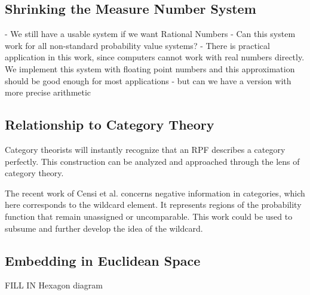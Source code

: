 \documentclass[twoside]{article}
\theoremstyle{plain}%
\theoremstyle{definition}
\theoremstyle{remark}
\begin{document}
\subsection{Shrinking the Measure Number System}
- We still have a usable system if we want Rational Numbers
- Can this system work for all non-standard probability value systems?
- There is practical application in this work, since computers cannot work with real numbers directly. We implement this system with floating point numbers and this approximation should be good enough for most applications - but can we have a version with more precise arithmetic
\subsection{Relationship to Category Theory}

Category theorists will instantly recognize that an RPF describes a category perfectly. This construction can be analyzed and approached through the lens of category theory.

The recent work of Censi et al.\cite{censi} concerns negative information in categories, which here corresponds to the wildcard element. It represents regions of the probability function that remain unassigned or uncomparable. This work could be used to subsume and further develop the idea of the wildcard.
\subsection{Embedding in Euclidean Space}
\label{section:euclidean_embedding}
FILL IN
Hexagon diagram

\end{document}
